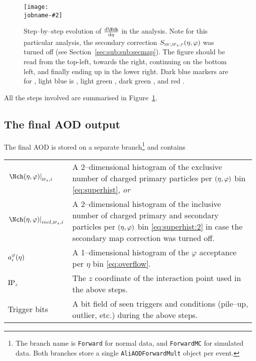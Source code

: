 \documentclass[compat,11pt]{alicenote}
\DeclareRobustCommand{\AlwaysText}[1]{\ifmmode\relax\text{#1}\else #1\fi}
\newcommand*{\etaphi}{\ensuremath(\eta,\varphi)}
\newcommand*\SecMap{\ensuremath S_{\subMC,\subIPz,r}\etaphi}
\newcommand{\AOD}{\AlwaysText{AOD}}
\newcommand{\secref}[1]{Section~\ref{#1}}
\newcommand{\figref}[1]{Figure~\ref{#1}}
\newcommand{\dndetadphi}[1][]{{\ensuremath%
    \ifx|#1|\else\left.\fi%
      \Nch\etaphi%
      \ifx|#1|\else\right|_{#1}\fi}}
\newcommand{\phiAcc}{\ensuremath a_i^{\varphi}(\eta)}
\newcommand\figinput[2][\textwidth]{%
  \texttt{[image: \\jobname-\#2]}}
\begin{document}
\begin{figure}[]
  \centering
  \figinput[.9\textwidth]{steps}
  \caption{Step--by--step evolution of $\dndeta$ in the analysis.
    Note for this particular analysis, the secondary correction
    $\SecMap{}$ was turned off (see \secref{sec:sub:sub:secmap}). The
    figure should be read from the top-left, towards the right,
    continuing on the bottom left, and finally ending up in the lower
    right. Dark blue markers are for , light blue is
    , light green , dark green , and red
    .}
  \label{fig:steps}
\end{figure} 

All the steps involved are summarised in \figref{fig:steps}. 

\subsection{The final \AOD{} output} 

The final \FMD{} \AOD{} is stored on a separate branch\footnote{The
  branch name is \texttt{Forward} for normal data, and
  \texttt{ForwardMC} for simulated data. Both branches store a single
  \texttt{AliAODForwardMult} object per event.} and contains 

\begin{tabular}[T]{p{.2\linewidth}p{.76\linewidth}}
  $\dndetadphi[\subIPz,i]$ & A 2--dimensional histogram of the
                             exclusive number of charged primary
                             particles per $\etaphi$ bin
                             \eqref{eq:superhist}, \emph{or}\\ 
  $\dndetadphi[incl,\subIPz,i]$ & A 2--dimensional histogram of the
                                  inclusive number of charged primary
                                  and secondary particles per
                                  $\etaphi$ bin \eqref{eq:superhist:2}
                                  in case the secondary map correction
                                  was turned off.\\   
  $\phiAcc{}$ & A 1--dimensional histogram of the $\varphi$ acceptance
                per $\eta$ bin \eqref{eq:overflow}. \\
  $\IPz$ & The $z$ coordinate of the interaction point used in the
           above steps.\\
  Trigger bits & A bit field of seen triggers and conditions
                 (pile--up, \SPD{} outlier, etc.) during the above steps.\\ 
\end{tabular}
\end{document}
